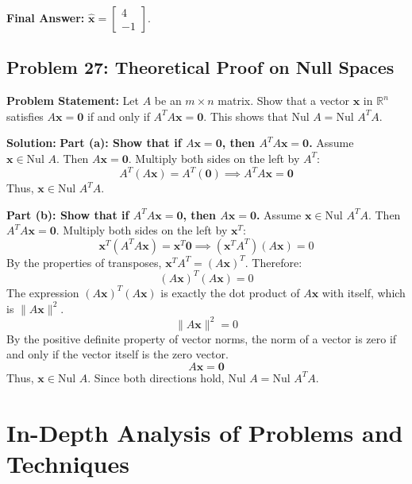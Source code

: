 \documentclass[11pt, letterpaper]{article}
\theoremstyle{definition}
\theoremstyle{remark}
\newcommand{\R}{\mathbb{R}}
\begin{document}
\textbf{Final Answer:} $\hat{\mathbf{x}} = \begin{bmatrix} 4 \\ -1 \end{bmatrix}$.

\vspace{1em}
\subsection{Problem 27: Theoretical Proof on Null Spaces}
\textbf{Problem Statement:} Let $A$ be an $m \times n$ matrix. Show that a vector $\mathbf{x}$ in $\R^n$ satisfies $A\mathbf{x} = \mathbf{0}$ if and only if $A^T A \mathbf{x} = \mathbf{0}$. This shows that $\text{Nul } A = \text{Nul } A^T A$.

\textbf{Solution:}
\textbf{Part (a): Show that if $A\mathbf{x} = \mathbf{0}$, then $A^T A \mathbf{x} = \mathbf{0}$.}
Assume $\mathbf{x} \in \text{Nul } A$. Then $A\mathbf{x} = \mathbf{0}$.
Multiply both sides on the left by $A^T$:
\[ A^T (A\mathbf{x}) = A^T (\mathbf{0}) \implies A^T A \mathbf{x} = \mathbf{0} \]
Thus, $\mathbf{x} \in \text{Nul } A^T A$.

\textbf{Part (b): Show that if $A^T A \mathbf{x} = \mathbf{0}$, then $A\mathbf{x} = \mathbf{0}$.}
Assume $\mathbf{x} \in \text{Nul } A^T A$. Then $A^T A \mathbf{x} = \mathbf{0}$.
Multiply both sides on the left by $\mathbf{x}^T$:
\[ \mathbf{x}^T (A^T A \mathbf{x}) = \mathbf{x}^T \mathbf{0} \implies (\mathbf{x}^T A^T) (A\mathbf{x}) = 0 \]
By the properties of transposes, $\mathbf{x}^T A^T = (A\mathbf{x})^T$. Therefore:
\[ (A\mathbf{x})^T (A\mathbf{x}) = 0 \]
The expression $(A\mathbf{x})^T (A\mathbf{x})$ is exactly the dot product of $A\mathbf{x}$ with itself, which is $\|A\mathbf{x}\|^2$.
\[ \|A\mathbf{x}\|^2 = 0 \]
By the positive definite property of vector norms, the norm of a vector is zero if and only if the vector itself is the zero vector.
\[ A\mathbf{x} = \mathbf{0} \]
Thus, $\mathbf{x} \in \text{Nul } A$. Since both directions hold, $\text{Nul } A = \text{Nul } A^T A$.

\newpage
\section{In-Depth Analysis of Problems and Techniques}
\end{document}
